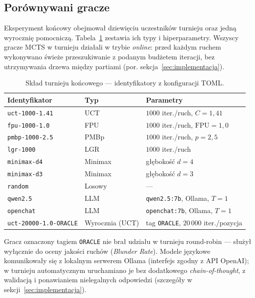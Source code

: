 \documentclass[11pt, a4paper]{article}
\begin{document}
\subsection{Porównywani gracze}
\label{sec:gracze}

Eksperyment końcowy obejmował dziewięciu uczestników turnieju oraz jedną wyrocznię pomocniczą. Tabela~\ref{tab:players} zestawia ich typy i hiperparametry. Wszyscy gracze MCTS w turnieju działali w trybie \emph{online}: przed każdym ruchem wykonywano świeże przeszukiwanie z podanym budżetem iteracji, bez utrzymywania drzewa między partiami (por. sekcja~\ref{sec:implementacja}).

\begin{table}[H]
    \centering
    \caption{Skład turnieju końcowego --- identyfikatory z konfiguracji TOML.}
    \label{tab:players}
    \small
    \begin{tabular}{lll}
        \toprule
        \textbf{Identyfikator} & \textbf{Typ} & \textbf{Parametry} \\
        \midrule
        \texttt{uct-1000-1.41} & UCT & $1000$ iter./ruch, $C = 1{,}41$ \\
        \texttt{fpu-1000-1.0} & FPU & $1000$ iter./ruch, $\mathrm{FPU} = 1{,}0$ \\
        \texttt{pmbp-1000-2.5} & PMBp & $1000$ iter./ruch, $p = 2{,}5$ \\
        \texttt{lgr-1000} & LGR & $1000$ iter./ruch \\
        \texttt{minimax-d4} & Minimax & głębokość $d = 4$ \\
        \texttt{minimax-d3} & Minimax & głębokość $d = 3$ \\
        \texttt{random} & Losowy & --- \\
        \texttt{qwen2.5} & LLM & \texttt{qwen2.5:7b}, Ollama, $T{=}1$ \\
        \texttt{openchat} & LLM & \texttt{openchat:7b}, Ollama, $T{=}1$ \\
        \texttt{uct-20000-1.0-ORACLE} & Wyrocznia (UCT) & tag \texttt{ORACLE}, $20\,000$ iter./pozycja \\
        \bottomrule
    \end{tabular}
\end{table}

Gracz oznaczony tagiem \texttt{ORACLE} nie brał udziału w turnieju round-robin --- służył wyłącznie do oceny jakości ruchów (\textit{Blunder Rate}). Modele językowe komunikowały się z lokalnym serwerem Ollama (interfejs zgodny z API OpenAI); w turnieju automatycznym uruchamiano je bez dodatkowego \emph{chain-of-thought}, z walidacją i ponawianiem nielegalnych odpowiedzi (szczegóły w sekcji~\ref{sec:implementacja}).
\end{document}
